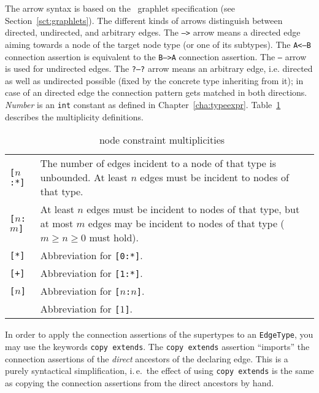 The arrow syntax is based on the \GrG\ graphlet specification (see Section~\ref{sct:graphlets}).
The different kinds of arrows distinguish between directed, undirected, and arbitrary edges.
The \texttt{-->} arrow means a directed edge aiming towards a node of the target node type (or one of its subtypes).
The \texttt{A<--B} connection assertion is equivalent to the \texttt{B-->A} connection assertion.
The \texttt{--} arrow is used for undirected edges.
The \texttt{?--?} arrow means an arbitrary edge, i.e. directed as well as undirected possible (fixed by the concrete type inheriting from it); in case of an directed edge the connection pattern gets matched in both directions.
\emph{Number} is an \texttt{int} constant as defined in Chapter~\ref{cha:typeexpr}.
Table~\ref{multiplicities} describes the multiplicity definitions.

\begin{table}[htbp]
\begin{tabularx}{\linewidth}{|l|X|}\hline
	\texttt{[$n$:*]} & The number of edges incident to a node of that type is unbounded. At least $n$ edges must be incident to nodes of that type.\\
	\texttt{[$n$:$m$]} & At least $n$ edges must be incident to nodes of that type, but at most $m$ edges may be incident to nodes of that type ($m \geq n \geq 0$ must hold).\\
	\texttt{[*]} & Abbreviation for \texttt{[0:*]}.\\
	\texttt{[+]} & Abbreviation for \texttt{[1:*]}.\\
	\texttt{[$n$]} & Abbreviation for \texttt{[$n$:$n$]}.\\
	               & Abbreviation for \texttt{[$1$]}. \\ \hline
\end{tabularx}
\caption{\GrG\ node constraint multiplicities}
\label{multiplicities}
\end{table}

In order to apply the connection assertions of the supertypes to an \texttt{EdgeType}, you may use the keywords \texttt{copy extends}.
The \texttt{copy extends} assertion ``imports'' the connection assertions of the \emph{direct} ancestors of the declaring edge.
This is a purely syntactical simplification, i.\,e.\ the effect of using \texttt{copy extends} is the same as copying the connection assertions from the direct ancestors by hand.

